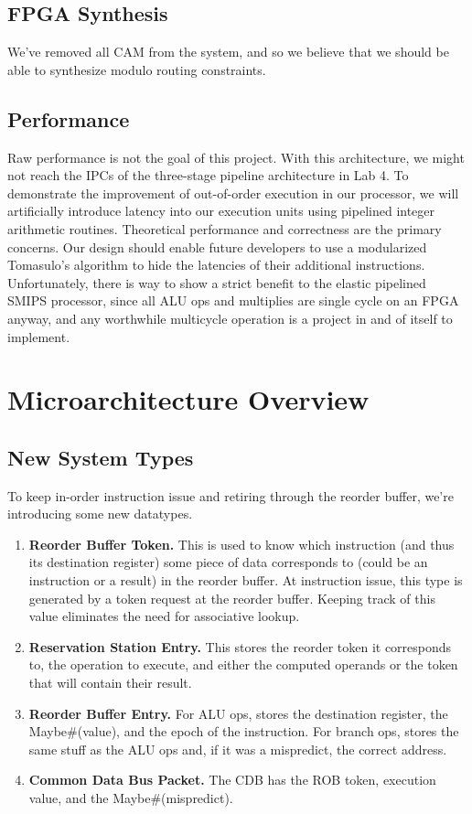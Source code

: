 \documentclass[12pt]{article}
\begin{document}
\subsection{FPGA Synthesis}
We've removed all CAM from the system, and so we believe that we should be able to 
synthesize modulo routing constraints.

\subsection{Performance}
Raw performance is not the goal of this project. With this architecture, we might not 
reach the IPCs of the three-stage pipeline architecture in Lab 4. To demonstrate the 
improvement of out-of-order execution in our processor, we will artificially introduce 
latency into our execution units using pipelined integer arithmetic routines. Theoretical 
performance and correctness are the primary concerns. Our design 
should enable future developers to use  a modularized Tomasulo's algorithm to hide the 
latencies of their additional instructions.
Unfortunately, there is way to show a strict benefit to the elastic pipelined SMIPS 
processor, since all ALU ops and multiplies  are single cycle on an FPGA anyway, and any 
worthwhile multicycle operation is a project in and of itself to implement.


\section{Microarchitecture Overview}

\subsection{New System Types}

To keep in-order instruction issue and retiring through the reorder buffer, we're introducing some new datatypes. 

\begin{enumerate}
    \item \textbf{Reorder Buffer Token.} This is used to know which instruction (and thus its destination register) some piece of data corresponds to (could be an instruction or a result) in the reorder buffer. At instruction issue, this type is generated by a token request at the 
reorder buffer. Keeping track of this value eliminates the need for associative lookup.
    \item \textbf{Reservation Station Entry.} This stores the reorder token it corresponds to, the operation to execute, and either the computed operands or the token that will contain their result. 
    \item \textbf{Reorder Buffer Entry.} For ALU ops, stores the destination register, the Maybe\#(value), and the epoch of the instruction. For branch ops, stores the same stuff as the ALU ops and, if it was a mispredict, the correct address.
    \item \textbf{Common Data Bus Packet.} The CDB has the ROB token, execution value, and the Maybe\#(mispredict). 
\end{enumerate}
\end{document}

